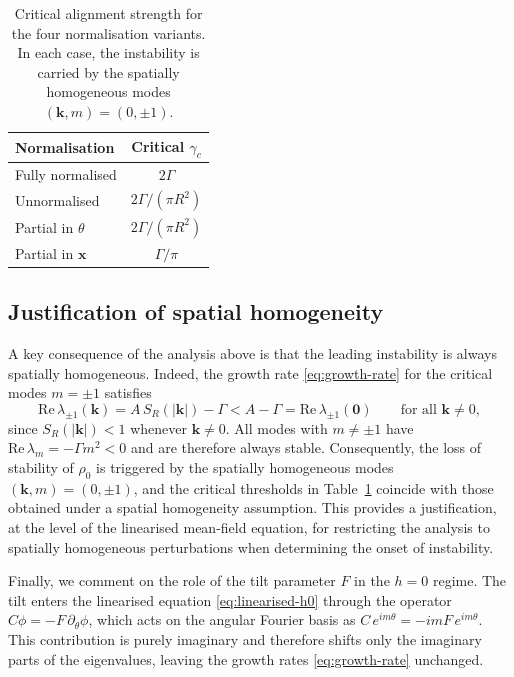 \documentclass[a4paper,11pt]{article}
\theoremstyle{plain}
\theoremstyle{definition}
\theoremstyle{remark}
\newcommand{\bx}{\mathbf{x}}
\newcommand{\bk}{\mathbf{k}}
\begin{document}
\begin{table}[H]
\centering
\renewcommand{\arraystretch}{1.4}
\begin{tabular}{lc}
\hline
\textbf{Normalisation} & \textbf{Critical $\gamma_c$} \\
\hline
Fully normalised & $2\Gamma$ \\
Unnormalised & $2\Gamma/(\pi R^2)$ \\
Partial in $\theta$ & $2\Gamma/(\pi R^2)$ \\
Partial in $\bx$  & $\Gamma / \pi$ \\
\hline
\end{tabular}
\caption{Critical alignment strength for the four normalisation variants. In each case, the instability is carried by the spatially homogeneous modes $(\bk,m) = (0,\pm 1)$.}
\label{tab:thresholds}
\end{table}

\subsection{Justification of spatial homogeneity}\label{subsec:spatial-homog}

A key consequence of the analysis above is that the leading instability is always spatially homogeneous. Indeed, the growth rate \eqref{eq:growth-rate} for the critical modes $m = \pm 1$ satisfies
\[
    \mathrm{Re}\,\lambda_{\pm 1}(\bk) = A\,S_R(|\bk|) - \Gamma
    < A - \Gamma = \mathrm{Re}\,\lambda_{\pm 1}(\mathbf{0})
    \qquad \text{for all } \bk \neq 0,
\]
since $S_R(|\bk|) < 1$ whenever $\bk \neq 0$. All modes with $m \neq \pm 1$ have $\mathrm{Re}\,\lambda_m = -\Gamma m^2 < 0$ and are therefore always stable. Consequently, the loss of stability of $\rho_0$ is triggered by the spatially homogeneous modes $(\bk,m) = (0,\pm 1)$, and the critical thresholds in Table~\ref{tab:thresholds} coincide with those obtained under a spatial homogeneity assumption.
This provides a justification, at the level of the linearised mean-field equation, for restricting the analysis to spatially homogeneous perturbations when determining the onset of instability.

Finally, we comment on the role of the tilt parameter $F$ in the $h=0$ regime.
The tilt enters the linearised equation \eqref{eq:linearised-h0} through the operator $C\phi = -F\,\partial_\theta\phi$, which acts on the angular Fourier basis as $C\,e^{im\theta} = -imF\,e^{im\theta}$. This contribution is purely imaginary and therefore shifts only the imaginary parts of the eigenvalues, leaving the growth rates \eqref{eq:growth-rate} unchanged.
\end{document}
